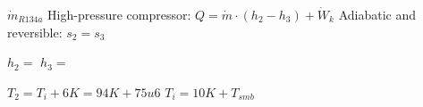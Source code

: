 \( \dot{m}_{R134a} \)  
High-pressure compressor:  
\( Q = \dot{m} \cdot (h_2 - h_3) + \dot{W}_k \)  
Adiabatic and reversible: \( s_2 = s_3 \)  

\( h_2 = \)  
\( h_3 = \)  

\( T_2 = T_i + 6K = 94K + 75u6 \)  
\( T_i = 10K + T_{smb} \)